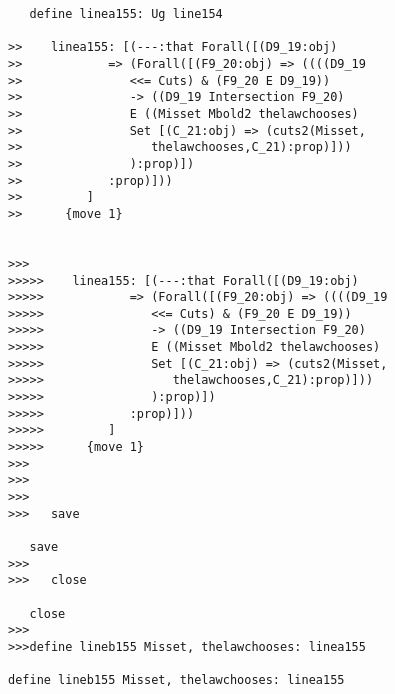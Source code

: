 \documentclass[12pt]{article}
\begin{document}
\begin{verbatim}
   define linea155: Ug line154

>>    linea155: [(---:that Forall([(D9_19:obj)
>>            => (Forall([(F9_20:obj) => ((((D9_19
>>               <<= Cuts) & (F9_20 E D9_19))
>>               -> ((D9_19 Intersection F9_20)
>>               E ((Misset Mbold2 thelawchooses)
>>               Set [(C_21:obj) => (cuts2(Misset,
>>                  thelawchooses,C_21):prop)]))
>>               ):prop)])
>>            :prop)]))
>>         ]
>>      {move 1}


>>>
>>>>>    linea155: [(---:that Forall([(D9_19:obj)
>>>>>            => (Forall([(F9_20:obj) => ((((D9_19
>>>>>               <<= Cuts) & (F9_20 E D9_19))
>>>>>               -> ((D9_19 Intersection F9_20)
>>>>>               E ((Misset Mbold2 thelawchooses)
>>>>>               Set [(C_21:obj) => (cuts2(Misset,
>>>>>                  thelawchooses,C_21):prop)]))
>>>>>               ):prop)])
>>>>>            :prop)]))
>>>>>         ]
>>>>>      {move 1}
>>>
>>>
>>>
>>>   save

   save
>>>
>>>   close

   close
>>>
>>>define lineb155 Misset, thelawchooses: linea155

define lineb155 Misset, thelawchooses: linea155



\end{verbatim}
\end{document}
